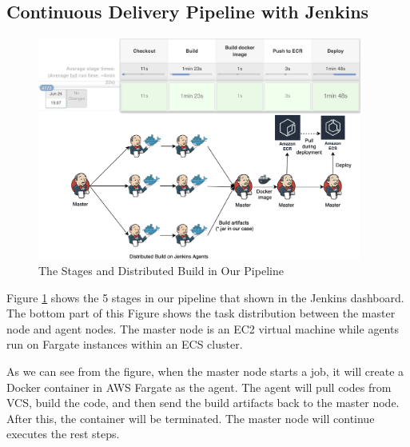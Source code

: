 \subsection{Continuous Delivery Pipeline with Jenkins}
\label{our-ci}
\begin{figure}[h]
 \centering
 \includegraphics[width=0.95\textwidth]{pics/overview.png}
 \caption{The Stages and Distributed Build in Our Pipeline}
 \label{fig:overview}
\end{figure}
Figure \ref{fig:overview} shows the 5 stages in our pipeline that shown in the Jenkins dashboard. The bottom part of this Figure shows the task distribution between the master node and agent nodes. The master node is an EC2 virtual machine while agents run on Fargate instances within an ECS cluster.
\par
As we can see from the figure, when the master node starts a job, it will create a Docker container in AWS Fargate as the agent. The agent will pull codes from VCS, build the code, and then send the build artifacts back to the master node. After this, the container will be terminated. The master node will continue executes the rest steps.
